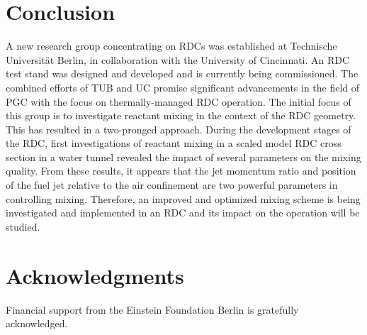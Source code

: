 \documentclass[]{aiaa-tc}%
\begin{document}
\section{Conclusion}
A new research group concentrating on RDCs was established at Technische Universität Berlin, in collaboration with the University of Cincinnati. An RDC test stand was designed and developed and is currently being commissioned. The combined efforts of TUB and UC promise significant advancements in the field of PGC with the focus on thermally-managed RDC operation. The initial focus of this group is to investigate reactant mixing in the context of the RDC geometry. This has resulted in a two-pronged approach. During the development stages of the RDC, first investigations of reactant mixing in a scaled model RDC cross section in a water tunnel revealed the impact of several parameters on the mixing quality. From these results, it appears that the jet momentum ratio and position of the fuel jet relative to the air confinement are two powerful parameters in controlling mixing. Therefore, an improved and optimized mixing scheme is being investigated and implemented in an RDC and its impact on the operation will be studied.

\section*{Acknowledgments}
Financial support from the Einstein Foundation Berlin is gratefully acknowledged.



\end{document}
